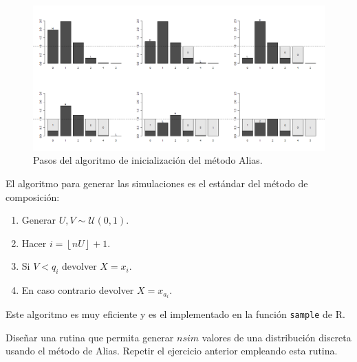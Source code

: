 \documentclass[]{book}
\theoremstyle{definition}
\theoremstyle{definition}
\theoremstyle{definition}
\theoremstyle{remark}
\let\BeginKnitrBlock\begin \let\EndKnitrBlock\end
\begin{document}
\begin{figure}[!htb]

{\centering \includegraphics[width=0.7\linewidth]{images/alias2} 

}

\caption{Pasos del algoritmo de inicialización del método Alias.}\label{fig:unnamed-chunk-23}
\end{figure}

El algoritmo para generar las simulaciones es el estándar del método de
composición:

\begin{enumerate}
\def\labelenumi{\arabic{enumi}.}
\item
  Generar \(U,V\sim \mathcal{U}\left( 0,1\right)\).
\item
  Hacer \(i=\left\lfloor nU\right\rfloor +1\).
\item
  Si \(V<q_{i}\) devolver \(X=x_{i}\).
\item
  En caso contrario devolver \(X=x_{a_{i}}\).
\end{enumerate}

Este algoritmo es muy eficiente y es el implementado en la función
\texttt{sample} de R.

\BeginKnitrBlock{exercise}
\protect\hypertarget{exr:unnamed-chunk-24}{}{\label{exr:unnamed-chunk-24} }
\EndKnitrBlock{exercise}

Diseñar una rutina que permita generar \(nsim\) valores de una
distribución discreta usando el método de Alias. Repetir el ejercicio
anterior empleando esta rutina.
\end{document}
